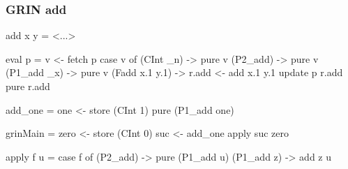 \documentclass[bigger,aspectratio=169]{beamer}
\begin{document}
\begin{frame}[fragile]
\frametitle{GRIN add}
\begin{center}

	\vspace{0.4cm}
	\begin{minipage}{0.45\textwidth}
		\begin{haskellcode}
			add x y =
			 <...>
		\end{haskellcode}
		\begin{haskellcode}
			eval p =
			 v <- fetch p
			 case v of
			  (CInt _n) -> pure v
			  (P2_add) -> pure v
			  (P1_add _x) -> pure v
			  (Fadd x.1 y.1) ->
			   r.add <- add x.1 y.1
			   update p r.add
			   pure r.add
		\end{haskellcode}
	\end{minipage}
	\hfill
	\begin{minipage}{0.50\textwidth}
		\begin{haskellcode}
			add_one =
			 one <- store (CInt 1)
			 pure (P1_add one)
		\end{haskellcode}
		\vfill
		\begin{haskellcode}
			grinMain =
			 zero <- store (CInt 0)
			 suc <- add_one
			 apply suc zero
		\end{haskellcode}
		\vfill
		\begin{haskellcode}
			apply f u =
			 case f of
			  (P2_add) ->
			   pure (P1_add u)
			  (P1_add z) -> add z u
		\end{haskellcode}
	\end{minipage}

\end{center}
\end{frame}
\end{document}
